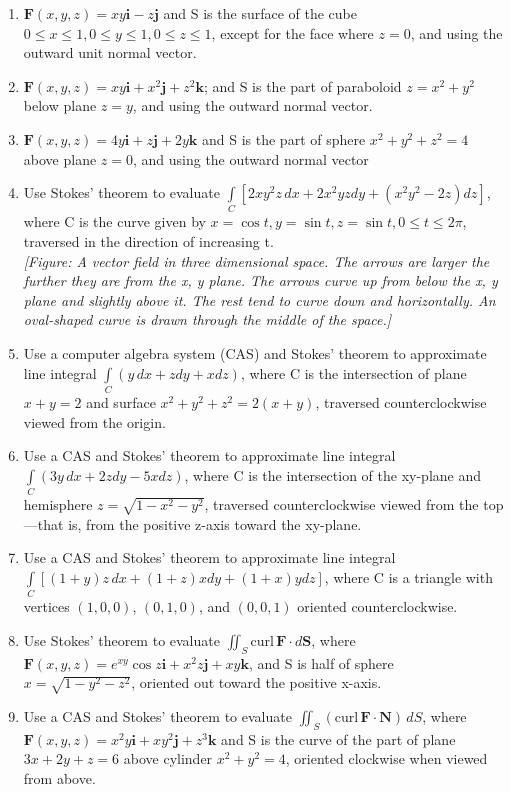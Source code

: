 \documentclass{exercises}
\begin{document}
\begin{enumerate}[resume]
\item $\mathbf{F}(x,y,z)=xy\mathbf{i}-z\mathbf{j}$ and S is the surface of the cube $0\le x\le1,0\le y\le1,0\le z\le1$, except for the face where $z=0$, and using the outward unit normal vector.
\item $\mathbf{F}(x,y,z)=xy\mathbf{i}+x^{2}\mathbf{j}+z^{2}\mathbf{k}$; and S is the part of paraboloid $z=x^{2}+y^{2}$ below plane $z=y$, and using the outward normal vector.
\item $\mathbf{F}(x,y,z)=4y\mathbf{i}+z\mathbf{j}+2y\mathbf{k}$ and S is the part of sphere $x^{2}+y^{2}+z^{2}=4$ above plane $z=0$, and using the outward normal vector
\item Use Stokes' theorem to evaluate $\underset{C}{\int}[2xy^{2}z\,dx+2x^{2}yzdy+(x^{2}y^{2}-2z)dz]$, where C is the curve given by $x=\cos t,y=\sin t,z=\sin t,0\le t\le2\pi$, traversed in the direction of increasing t. \\ \textit{[Figure: A vector field in three dimensional space. The arrows are larger the further they are from the x, y plane. The arrows curve up from below the x, y plane and slightly above it. The rest tend to curve down and horizontally. An oval-shaped curve is drawn through the middle of the space.]}
\item \techrequired Use a computer algebra system (CAS) and Stokes' theorem to approximate line integral $\underset{C}{\int}(y\,dx+zdy+xdz)$, where C is the intersection of plane $x+y=2$ and surface $x^{2}+y^{2}+z^{2}=2(x+y)$, traversed counterclockwise viewed from the origin.
\item \techrequired Use a CAS and Stokes' theorem to approximate line integral $\underset{C}{\int}(3y\,dx+2zdy-5xdz)$, where C is the intersection of the xy-plane and hemisphere $z=\sqrt{1-x^{2}-y^{2}}$, traversed counterclockwise viewed from the top---that is, from the positive z-axis toward the xy-plane.
\item \techrequired Use a CAS and Stokes' theorem to approximate line integral $\underset{C}{\int}[(1+y)z\,dx+(1+z)xdy+(1+x)ydz]$, where C is a triangle with vertices $(1,0,0)$, $(0,1,0)$, and $(0,0,1)$ oriented counterclockwise.
\item Use Stokes' theorem to evaluate $\iint_{S}\text{curl}\,\mathbf{F}\cdot d\mathbf{S}$, where $\mathbf{F}(x,y,z)=e^{xy}\cos z\mathbf{i}+x^{2}z\mathbf{j}+xy\mathbf{k}$, and S is half of sphere $x=\sqrt{1-y^{2}-z^{2}}$, oriented out toward the positive x-axis.
\item \techrequired Use a CAS and Stokes' theorem to evaluate $\iint_{S}(\text{curl}\,\mathbf{F}\cdot \mathbf{N})\,dS$, where $\mathbf{F}(x,y,z)=x^{2}y\mathbf{i}+xy^{2}\mathbf{j}+z^{3}\mathbf{k}$ and S is the curve of the part of plane $3x+2y+z=6$ above cylinder $x^{2}+y^{2}=4$, oriented clockwise when viewed from above.

\end{enumerate}
\end{document}
